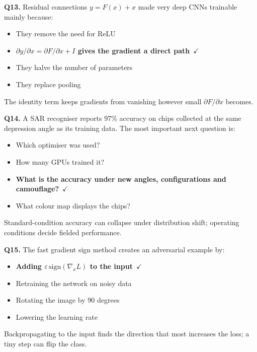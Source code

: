 \documentclass[11pt]{article}
\begin{document}
{\noindent\textbf{Q13.} Residual connections $y=F(x)+x$ made very deep CNNs trainable mainly because:\begin{itemize}[leftmargin=2.2em,itemsep=0pt,topsep=1pt]\item[A.] They remove the need for ReLU\item[\textbf{B.}] \textbf{$\partial y/\partial x=\partial F/\partial x+I$ gives the gradient a direct path}~{\color{GrnN}$\checkmark$}\item[C.] They halve the number of parameters\item[D.] They replace pooling\end{itemize} The identity term keeps gradients from vanishing however small $\partial F/\partial x$ becomes.\par\medskip

\noindent\textbf{Q14.} A SAR recogniser reports 97\% accuracy on chips collected at the same depression angle as its training data. The most important next question is:\begin{itemize}[leftmargin=2.2em,itemsep=0pt,topsep=1pt]\item[A.] Which optimiser was used?\item[B.] How many GPUs trained it?\item[\textbf{C.}] \textbf{What is the accuracy under new angles, configurations and camouflage?}~{\color{GrnN}$\checkmark$}\item[D.] What colour map displays the chips?\end{itemize} Standard-condition accuracy can collapse under distribution shift; operating conditions decide fielded performance.\par\medskip

\noindent\textbf{Q15.} The fast gradient sign method creates an adversarial example by:\begin{itemize}[leftmargin=2.2em,itemsep=0pt,topsep=1pt]\item[\textbf{A.}] \textbf{Adding $\varepsilon\,\text{sign}(\nabla_xL)$ to the input}~{\color{GrnN}$\checkmark$}\item[B.] Retraining the network on noisy data\item[C.] Rotating the image by 90 degrees\item[D.] Lowering the learning rate\end{itemize} Backpropagating to the input finds the direction that most increases the loss; a tiny step can flip the class.\par\medskip

}
\end{document}
